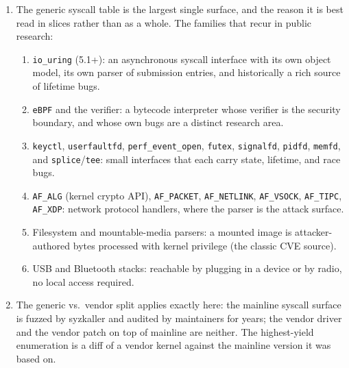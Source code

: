 \documentclass[12pt]{Training}
\begin{document}
\begin{enumerate}
    \item The generic syscall table is the largest single surface, and the reason it is best read in slices rather than as a whole. The families that recur in public research:
    \begin{enumerate}
        \item \lstinline{io_uring} (5.1+): an asynchronous syscall interface with its own object model, its own parser of submission entries, and historically a rich source of lifetime bugs.
        \item \lstinline{eBPF} and the verifier: a bytecode interpreter whose verifier is the security boundary, and whose own bugs are a distinct research area.
        \item \lstinline{keyctl}, \lstinline{userfaultfd}, \lstinline{perf_event_open}, \lstinline{futex}, \lstinline{signalfd}, \lstinline{pidfd}, \lstinline{memfd}, and \lstinline{splice}/\lstinline{tee}: small interfaces that each carry state, lifetime, and race bugs.
        \item \lstinline{AF_ALG} (kernel crypto API), \lstinline{AF_PACKET}, \lstinline{AF_NETLINK}, \lstinline{AF_VSOCK}, \lstinline{AF_TIPC}, \lstinline{AF_XDP}: network protocol handlers, where the parser is the attack surface.
        \item Filesystem and mountable-media parsers: a mounted image is attacker-authored bytes processed with kernel privilege (the classic CVE source).
        \item USB and Bluetooth stacks: reachable by plugging in a device or by radio, no local access required.
    \end{enumerate}
    \item The generic vs.\ vendor split applies exactly here: the mainline syscall surface is fuzzed by syzkaller and audited by maintainers for years; the vendor driver and the vendor patch on top of mainline are neither. The highest-yield enumeration is a diff of a vendor kernel against the mainline version it was based on.
\end{enumerate}
\end{document}
